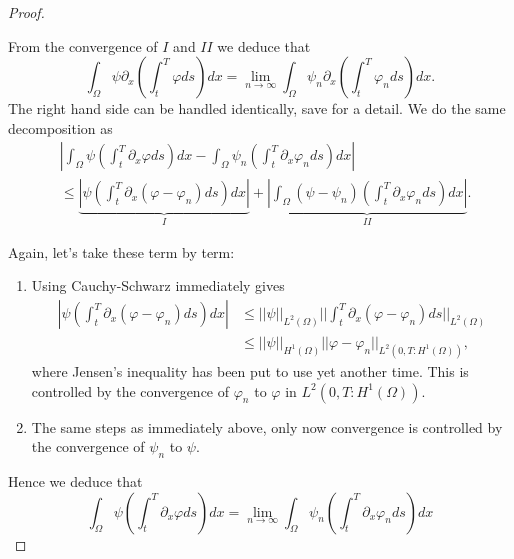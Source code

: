 \documentclass[11pt, a4paper]{article}
\begin{document}
\begin{appendix}
\begin{proof}
\begin{enumerate}[I:]
\end{enumerate}
From the convergence of $I$ and $II$ we deduce that
\begin{equation}
\label{diff_results_LHS}
\int_{\Omega}\psi \partial_x \left( \int_t^T\varphi ds \right)dx = \lim_{n\to \infty}\int_{\Omega}\psi_n \partial_x \left( \int_t^T \varphi_n ds \right) dx.
\end{equation}
The right hand side can be handled identically, save for a detail.
We do the same decomposition as
\begin{align*}
&\left| \int_\Omega \psi \left( \int_t^T \partial_x \varphi ds \right)dx - \int_\Omega \psi_n \left( \int_t^T \partial_x \varphi_n ds \right)dx \right| \\
&\leq \underbrace{ \left| \psi \left( \int_t^T \partial_x (\varphi - \varphi_n)ds \right) dx\right|}_{I} + \underbrace{ \left| \int_\Omega (\psi - \psi_n) \left( \int_t^T \partial_x \varphi_n ds \right) dx \right|}_{II}.
\end{align*}

Again, let's take these term by term:

\begin{enumerate}[I:]

\item Using Cauchy-Schwarz immediately gives
\begin{align*}
\left| \psi \left( \int_t^T \partial_x (\varphi - \varphi_n)ds \right) dx\right| & \leq ||\psi||_{L^2(\Omega)} \big| \big| \int_t^T \partial_x(\varphi - \varphi_n) ds \big| \big|_{L^2(\Omega)} \\
& \leq ||\psi||_{H^1(\Omega)}||\varphi - \varphi_n||_{L^2(0,T:H^1(\Omega))},
\end{align*}
where Jensen's inequality has been put to use yet another time. This is controlled by the convergence of $\varphi_n$ to $\varphi$ in $L^2(0,T: H^1(\Omega))$.

\item The same steps as immediately above, only now convergence is controlled by the convergence of $\psi_n$ to $\psi$. 
\end{enumerate}

Hence we deduce that
\begin{equation}
\label{diff_results_RHS}
\int_\Omega \psi \left( \int_t^T \partial_x \varphi ds \right)dx = \lim_{n \to \infty} \int_\Omega \psi_n \left( \int_t^T \partial_x \varphi_n ds \right)dx
\end{equation}



\end{proof}
\end{appendix}
\end{document}
